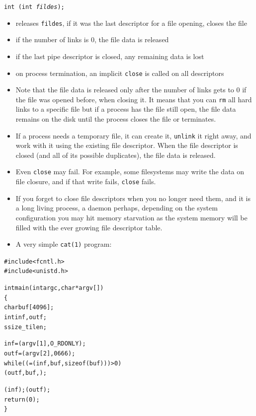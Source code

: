 

\begin{slide}
\texttt{int (int \emph{fildes});} 
\begin{itemize}
\item releases \texttt{fildes}, if it was the last descriptor for a file
opening, closes the file
\item if the number of links is 0, the file data is released
\item if the last pipe descriptor is closed, any remaining data is lost
\item on process termination, an implicit \texttt{close} is called on all
descriptors
\end{itemize}
\end{slide}

\begin{itemize}
\item Note that the file data is released only after the number of links gets to
0  if the file was opened before, when closing it.  It means that you
can \texttt{rm} all hard links to a specific file but if a process has the file
still open, the file data remains on the disk until the process closes the file
or terminates.
\item If a process needs a temporary file, it can create it, \texttt{unlink} it
right away, and work with it using the existing file descriptor.  When the file
descriptor is closed (and all of its possible duplicates), the file data is
released.
\item Even \texttt{close} may fail.  For example, some filesystems may write the
data on file closure, and if that write fails, \texttt{close} fails.
\item If you forget to close file descriptors when you no longer need them,
and it is a long living process, a daemon perhaps, depending on the system
configuration you may hit memory starvation as the system memory will be filled
with the ever growing file descriptor table.
\item \label{SIMPLE_CAT} A very simple \texttt{cat(1)} program:
\end{itemize}


\begin{slide}
\begin{alltt}
{\footnotesize
#include <fcntl.h>
#include <unistd.h>

int main(int argc, char *argv[])
\{
    char buf[4096];
    int inf, outf;
    ssize\_t ilen;

    inf = (argv[1], O\_RDONLY);
    outf = (argv[2], 0666);
    while (( = (inf, buf, sizeof (buf))) > 0)
            (outf, buf, );

    (inf); (outf);
    return (0);
\}
}
\end{alltt}
\end{slide}

